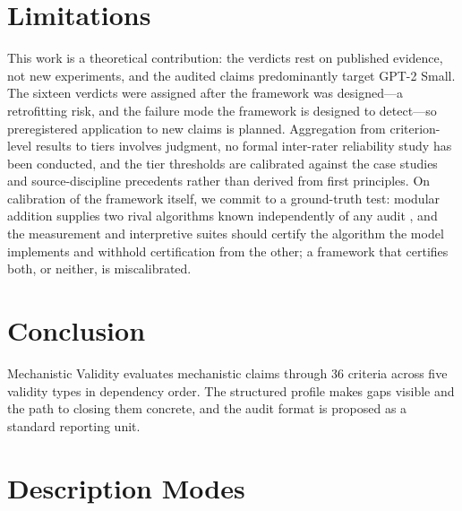 \documentclass{article}
\begin{document}
\section{Limitations}
\label{sec:limitations}

This work is a theoretical contribution: the verdicts rest on published evidence, not new experiments, and the audited claims predominantly target GPT-2 Small. The sixteen verdicts were assigned after the framework was designed---a retrofitting risk, and the failure mode the framework is designed to detect---so preregistered application to new claims is planned. Aggregation from criterion-level results to tiers involves judgment, no formal inter-rater reliability study has been conducted, and the tier thresholds are calibrated against the case studies and source-discipline precedents rather than derived from first principles. On calibration of the framework itself, we commit to a ground-truth test: modular addition supplies two rival algorithms known independently of any audit \citep{zhong2023clock}, and the measurement and interpretive suites should certify the algorithm the model implements and withhold certification from the other; a framework that certifies both, or neither, is miscalibrated.

\section{Conclusion}
\label{sec:conclusion}

Mechanistic Validity evaluates mechanistic claims through 36 criteria across five validity types in dependency order. The structured profile makes gaps visible and the path to closing them concrete, and the audit format is proposed as a standard reporting unit.




\clearpage
\appendix

\section{Description Modes}
\label{appendix:modes}
\end{document}
